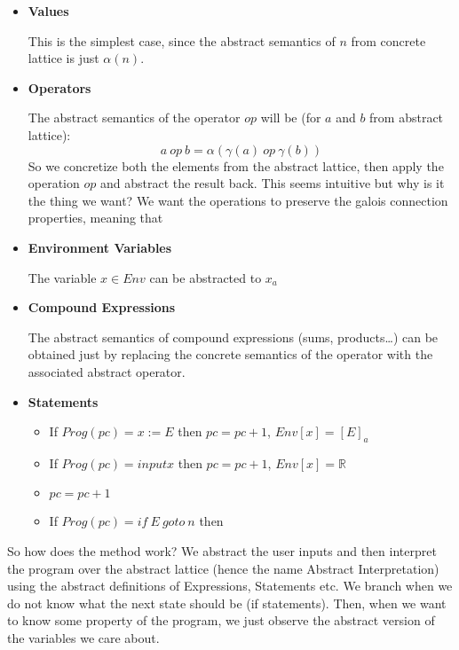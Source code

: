 \begin{itemize}
    \item \textbf{Values}

    This is the simplest case, since the abstract semantics of $n$ from concrete lattice is just $\alpha(n)$.

    \item \textbf{Operators}

    The abstract semantics of the operator $op$ will be (for $a$ and $b$ from abstract lattice):
    \[a \: op \: b = \alpha(\gamma(a) \: op \: \gamma(b))\]
    So we concretize both the elements from the abstract lattice, then apply the operation $op$ and abstract the result
    back.
    This seems intuitive but why is it the thing we want?
    We want the operations to preserve the galois connection properties, meaning that 


    \item \textbf{Environment Variables}

    The variable $x \in Env$ can be abstracted to $x_a$
    \item \textbf{Compound Expressions}

    The abstract semantics of compound expressions (sums, products\ldots) can be obtained just by replacing the
    concrete semantics of the operator with the associated abstract operator.

    \item \textbf{Statements}

    \begin{itemize}
        \item
        If $Prog(pc) = x := E$ then
        $pc = pc + 1$, $Env[x] = [E]_a$

        \item
        If $Prog(pc) = input x$ then
        $pc = pc + 1$, $Env[x] = \mathbb{R}$ %

        \item
        $pc = pc + 1$

        \item
        If $Prog(pc) = if \: E \: goto \: n$ then
    \end{itemize}
\end{itemize}

So how does the method work?
We abstract the user inputs and then interpret the program over the abstract lattice (hence the name Abstract
Interpretation) using the abstract definitions of Expressions, Statements etc.
We branch when we do not know what the next state should be (if statements).
Then, when we want to know some property of the program, we just observe the abstract version of the variables we care
about.

